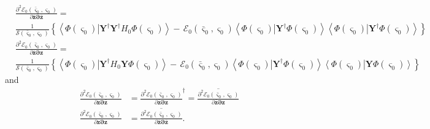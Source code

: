 \documentclass[aps,preprint]{revtex4}%
\begin{document}
\begin{align}
&  \frac{\partial^{2}\mathcal{E}_{0}\left(  \mathbf{\bar{\varsigma}}%
_{0},\mathbf{\varsigma}_{0}\right)  }{\partial\mathbf{\bar{z}\partial\bar{z}}%
}=\nonumber\\
&  \frac{1}{\mathcal{S}\left(  \mathbf{\bar{\varsigma}}_{0},\mathbf{\varsigma
}_{0}\right)  }\left\{  \left\langle \left.  \Phi\left(  \mathbf{\varsigma
}_{0}\right)  \right\vert \mathbf{Y}^{\dagger}\mathbf{Y}^{\dagger}H_{0}%
\Phi\left(  \mathbf{\varsigma}_{0}\right)  \right\rangle -\,\mathcal{E}%
_{0}\left(  \mathbf{\bar{\varsigma}}_{0},\mathbf{\varsigma}_{0}\right)
\left\langle \left.  \Phi\left(  \mathbf{\varsigma}_{0}\right)  \right\vert
\mathbf{Y}^{\dagger}\Phi\left(  \mathbf{\varsigma}_{0}\right)  \right\rangle
\left\langle \left.  \Phi\left(  \mathbf{\varsigma}_{0}\right)  \right\vert
\mathbf{Y}^{\dagger}\Phi\left(  \mathbf{\varsigma}_{0}\right)  \right\rangle
\right\} \nonumber\\
&  \frac{\partial^{2}\mathcal{E}_{0}\left(  \mathbf{\bar{\varsigma}}%
_{0},\mathbf{\varsigma}_{0}\right)  }{\partial\mathbf{\bar{z}\partial z}%
}=\nonumber\\
&  \frac{1}{\mathcal{S}\left(  \mathbf{\bar{\varsigma}}_{0},\mathbf{\varsigma
}_{0}\right)  }\left\{  \left\langle \left.  \Phi\left(  \mathbf{\varsigma
}_{0}\right)  \right\vert \mathbf{Y}^{\dagger}H_{0}\mathbf{Y}\Phi\left(
\mathbf{\varsigma}_{0}\right)  \right\rangle -\,\mathcal{E}_{0}\left(
\mathbf{\bar{\varsigma}}_{0},\mathbf{\varsigma}_{0}\right)  \left\langle
\left.  \Phi\left(  \mathbf{\varsigma}_{0}\right)  \right\vert \mathbf{Y}%
^{\dagger}\Phi\left(  \mathbf{\varsigma}_{0}\right)  \right\rangle
\left\langle \left.  \Phi\left(  \mathbf{\varsigma}_{0}\right)  \right\vert
\mathbf{Y}\Phi\left(  \mathbf{\varsigma}_{0}\right)  \right\rangle \right\}
\end{align}
and
\begin{align}
\frac{\partial^{2}\mathcal{E}_{0}\left(  \mathbf{\bar{\varsigma}}%
_{0},\mathbf{\varsigma}_{0}\right)  }{\partial\mathbf{z\partial\bar{z}}}  &
=\frac{\partial^{2}\mathcal{E}_{0}\left(  \mathbf{\bar{\varsigma}}%
_{0},\mathbf{\varsigma}_{0}\right)  }{\partial\mathbf{\bar{z}\partial z}%
}^{\dagger}=\overline{\frac{\partial^{2}\mathcal{E}_{0}\left(  \mathbf{\bar
{\varsigma}}_{0},\mathbf{\varsigma}_{0}\right)  }{\partial\mathbf{\bar
{z}\partial z}}}\nonumber\\
\frac{\partial^{2}\mathcal{E}_{0}\left(  \mathbf{\bar{\varsigma}}%
_{0},\mathbf{\varsigma}_{0}\right)  }{\partial\mathbf{z\partial z}}  &
=\overline{\frac{\partial^{2}\mathcal{E}_{0}\left(  \mathbf{\bar{\varsigma}%
}_{0},\mathbf{\varsigma}_{0}\right)  }{\partial\mathbf{\bar{z}\partial\bar{z}%
}}}.
\end{align}
\end{document}
